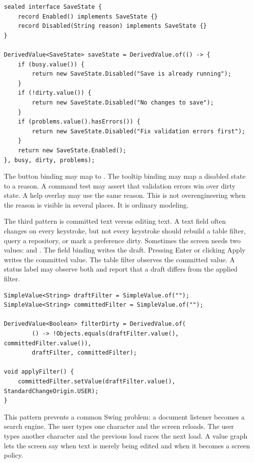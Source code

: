 \begin{lstlisting}[caption={Model disabled reason before adapting it to a button.}]
sealed interface SaveState {
    record Enabled() implements SaveState {}
    record Disabled(String reason) implements SaveState {}
}

DerivedValue<SaveState> saveState = DerivedValue.of(() -> {
    if (busy.value()) {
        return new SaveState.Disabled("Save is already running");
    }
    if (!dirty.value()) {
        return new SaveState.Disabled("No changes to save");
    }
    if (problems.value().hasErrors()) {
        return new SaveState.Disabled("Fix validation errors first");
    }
    return new SaveState.Enabled();
}, busy, dirty, problems);
\end{lstlisting}

The button binding may map  to .
The tooltip binding may map a disabled state to a reason. A command test may
assert that validation errors win over dirty state. A help overlay may use the
same reason. This is not overengineering when the reason is visible in several
places. It is ordinary modeling.

The third pattern is committed text versus editing text. A text field often
changes on every keystroke, but not every keystroke should rebuild a table
filter, query a repository, or mark a preference dirty. Sometimes the screen
needs two values:  and . The field
binding writes the draft. Pressing Enter or clicking Apply writes the committed
value. The table filter observes the committed value. A status label may observe
both and report that a draft differs from the applied filter.

\begin{lstlisting}[caption={Draft and committed values separate typing from policy.}]
SimpleValue<String> draftFilter = SimpleValue.of("");
SimpleValue<String> committedFilter = SimpleValue.of("");

DerivedValue<Boolean> filterDirty = DerivedValue.of(
        () -> !Objects.equals(draftFilter.value(), committedFilter.value()),
        draftFilter, committedFilter);

void applyFilter() {
    committedFilter.setValue(draftFilter.value(), StandardChangeOrigin.USER);
}
\end{lstlisting}

This pattern prevents a common Swing problem: a document listener becomes a
search engine. The user types one character and the screen reloads. The user
types another character and the previous load races the next load. A value graph
lets the screen say when text is merely being edited and when it becomes a
screen policy.

